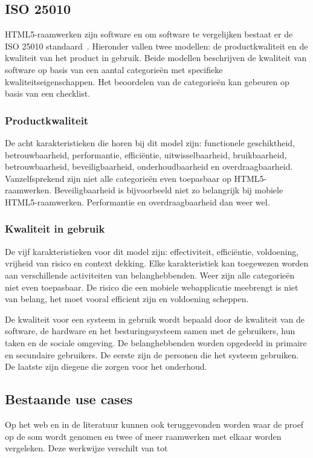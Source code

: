 \subsection{ISO 25010}
HTML5-raamwerken zijn software en om software te vergelijken bestaat er de ISO 25010 standaard~\cite{Standard2010}.  
Hieronder vallen twee modellen:  de productkwaliteit en de kwaliteit van het product in gebruik.  
Beide modellen beschrijven de kwaliteit van software op basis van een aantal categorieën met specifieke kwaliteitseigenschappen. 
Het beoordelen van de categorieën kan gebeuren op basis van een checklist. 
 
\subsubsection{Productkwaliteit}
De acht karakteristieken die horen bij dit model zijn: functionele geschiktheid,  betrouwbaarheid,  performantie, efficiëntie, uitwisselbaarheid,  bruikbaarheid,  betrouwbaarheid, beveiligbaarheid,  onderhoudbaarheid en overdraagbaarheid.   
Vanzelfsprekend zijn niet alle categorieën even toepasbaar op HTML5-raamwerken.  
Beveiligbaarheid is bijvoorbeeld niet zo belangrijk bij mobiele HTML5-raamwerken.  
Performantie en overdraagbaarheid dan weer wel.

\subsubsection{Kwaliteit in gebruik}
De vijf karakteristieken voor dit model zijn: effectiviteit,  efficiëntie,  voldoening,  vrijheid van risico en context dekking. 
Elke karakteristiek kan toegewezen worden aan verschillende activiteiten van belanghebbenden. 
Weer zijn alle categorieën niet even toepasbaar.  
De risico die een mobiele webapplicatie meebrengt is niet van belang,  het moet vooral efficient zijn en voldoening scheppen.

De kwaliteit voor een systeem in gebruik wordt bepaald door de kwaliteit van de software,  de hardware en het besturingssysteem samen met de gebruikers, hun taken en de sociale omgeving.  
De belanghebbenden worden opgedeeld in primaire en secundaire gebruikers.  
De eerste zijn de personen die het systeem gebruiken. 
De laatste zijn diegene die zorgen voor het onderhoud.

\subsection{Bestaande use cases}
Op het web en in de literatuur kunnen ook  teruggevonden worden waar de proef op de som wordt genomen en twee of meer raamwerken met elkaar worden vergeleken.  
Deze werkwijze verschilt van  tot 

